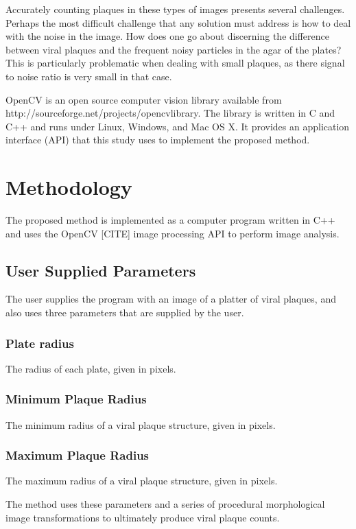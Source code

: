 \documentclass[11pt,final,twocolumn]{IEEEtran}
\begin{document}
Accurately counting plaques in these types of images presents several challenges. Perhaps the most difficult challenge that any solution must address is how to deal with the noise in the image.  How does one go about discerning the difference between viral plaques and the frequent noisy particles in the agar of the plates?  This is particularly problematic when dealing with small plaques, as there signal to noise ratio is very small in that case.  

OpenCV is an open source computer vision library available from http://sourceforge.net/projects/opencvlibrary. The library is written in C and C++ and runs under Linux, Windows, and Mac OS X. It provides an application interface (API) that this study uses to implement the proposed method. 


\section{Methodology}
The proposed method is implemented as a computer program written in C++ and uses the  OpenCV [CITE] image processing API to perform image analysis. 

\subsection{User Supplied Parameters}
The user supplies the program with an image of a platter of viral plaques, and also  uses three parameters that are supplied by the user. 
\subsubsection{Plate radius}
The radius of each plate, given in pixels.

\subsubsection{Minimum Plaque Radius}
 The minimum radius of a viral plaque structure, given in pixels.

\subsubsection{Maximum Plaque Radius}
 The maximum radius of a viral plaque structure, given in pixels.


The method uses these parameters and a series of procedural morphological image transformations to ultimately produce viral plaque counts.
\end{document}
